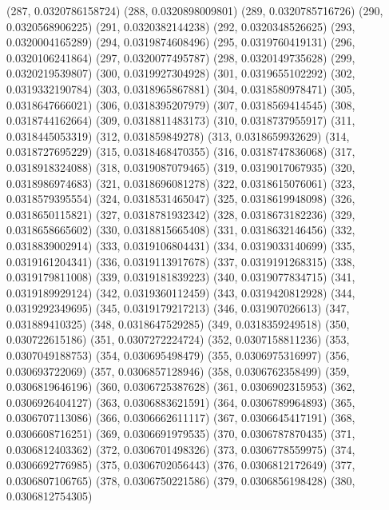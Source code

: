 {					(287, 0.0320786158724)
					(288, 0.0320898009801)
					(289, 0.0320785716726)
					(290, 0.0320568906225)
					(291, 0.0320382144238)
					(292, 0.0320348526625)
					(293, 0.0320004165289)
					(294, 0.0319874608496)
					(295, 0.0319760419131)
					(296, 0.0320106241864)
					(297, 0.0320077495787)
					(298, 0.0320149735628)
					(299, 0.0320219539807)
					(300, 0.0319927304928)
					(301, 0.0319655102292)
					(302, 0.0319332190784)
					(303, 0.0318965867881)
					(304, 0.0318580978471)
					(305, 0.0318647666021)
					(306, 0.0318395207979)
					(307, 0.0318569414545)
					(308, 0.0318744162664)
					(309, 0.0318811483173)
					(310, 0.0318737955917)
					(311, 0.0318445053319)
					(312, 0.031859849278)
					(313, 0.0318659932629)
					(314, 0.0318727695229)
					(315, 0.0318468470355)
					(316, 0.0318747836068)
					(317, 0.0318918324088)
					(318, 0.0319087079465)
					(319, 0.0319017067935)
					(320, 0.0318986974683)
					(321, 0.0318696081278)
					(322, 0.0318615076061)
					(323, 0.0318579395554)
					(324, 0.0318531465047)
					(325, 0.0318619948098)
					(326, 0.0318650115821)
					(327, 0.0318781932342)
					(328, 0.0318673182236)
					(329, 0.0318658665602)
					(330, 0.0318815665408)
					(331, 0.0318632146456)
					(332, 0.0318839002914)
					(333, 0.0319106804431)
					(334, 0.0319033140699)
					(335, 0.0319161204341)
					(336, 0.0319113917678)
					(337, 0.0319191268315)
					(338, 0.0319179811008)
					(339, 0.0319181839223)
					(340, 0.0319077834715)
					(341, 0.0319189929124)
					(342, 0.0319360112459)
					(343, 0.0319420812928)
					(344, 0.0319292349695)
					(345, 0.0319179217213)
					(346, 0.031907026613)
					(347, 0.031889410325)
					(348, 0.0318647529285)
					(349, 0.0318359249518)
					(350, 0.030722615186)
					(351, 0.0307272224724)
					(352, 0.0307158811236)
					(353, 0.0307049188753)
					(354, 0.030695498479)
					(355, 0.0306975316997)
					(356, 0.030693722069)
					(357, 0.0306857128946)
					(358, 0.0306762358499)
					(359, 0.0306819646196)
					(360, 0.0306725387628)
					(361, 0.0306902315953)
					(362, 0.0306926404127)
					(363, 0.0306883621591)
					(364, 0.0306789964893)
					(365, 0.0306707113086)
					(366, 0.0306662611117)
					(367, 0.0306645417191)
					(368, 0.0306608716251)
					(369, 0.0306691979535)
					(370, 0.0306787870435)
					(371, 0.0306812403362)
					(372, 0.0306701498326)
					(373, 0.0306778559975)
					(374, 0.0306692776985)
					(375, 0.0306702056443)
					(376, 0.0306812172649)
					(377, 0.0306807106765)
					(378, 0.0306750221586)
					(379, 0.0306856198428)
					(380, 0.0306812754305)
}
